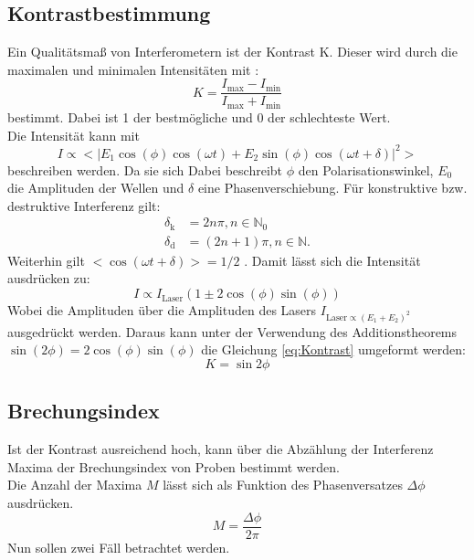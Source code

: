 \subsection{Kontrastbestimmung}
Ein Qualitätsmaß von Interferometern ist der Kontrast K. Dieser wird durch die maximalen
und minimalen Intensitäten mit :
\begin{equation}
	K= \frac{I_{\text{max}}-I_{\text{min}}}{I_{\text{max}}+I_{\text{min}}}
	\label{eq:Kontrast}
\end{equation}
bestimmt. Dabei ist 1 der bestmögliche und 0 der schlechteste Wert. \\
Die Intensität kann mit
\begin{equation}
	I \propto <|E_1 \cos{(\phi)}\cos{(\omega t)} + E_2 \sin{(\phi)}\cos{(\omega t + \delta)} |^2>
\end{equation}
beschreiben werden. Da sie sich  Dabei beschreibt $\phi$ den Polarisationswinkel, $E_0$ die
Amplituden der Wellen und $\delta$ eine Phasenverschiebung.
Für konstruktive bzw. destruktive Interferenz gilt:
\begin{align*}
	\delta_{\text{k}}&=2 n \pi , n \in \mathds{N}_0 \\
	\delta_{\text{d}}&=(2n+1)\pi , n \in \mathds{N} .
\end{align*}
Weiterhin gilt $<\cos(\omega t + \delta)>=1/2$ .
Damit lässt sich die Intensität ausdrücken zu:
\begin{equation}
	I \propto I_{\text{Laser}}\left(1\pm 2\cos{(\phi)}\sin{(\phi)}\right)
\end{equation}
Wobei die Amplituden über die Amplituden des Lasers $I_{\text{Laser}\propto (E_1+E_2)^2}$
ausgedrückt werden.
Daraus kann unter der Verwendung des Additionstheorems $\sin{(2\phi)}=2\cos{(\phi)}\sin{(\phi)}$
die Gleichung \ref{eq:Kontrast} umgeformt werden:
\begin{equation}
	K=\sin{2\phi}
	\label{eq:Kontrast2}
\end{equation}
\subsection{Brechungsindex}
Ist der Kontrast ausreichend hoch, kann über die Abzählung der Interferenz Maxima der
Brechungsindex von Proben bestimmt werden.\\
Die Anzahl der Maxima $M$ lässt sich als Funktion des Phasenversatzes $\Delta \phi$ ausdrücken.
\begin{equation}
	M=\frac{\Delta \phi}{2\pi}
\label{eq:dp}
\end{equation}
Nun sollen zwei Fäll betrachtet werden.
